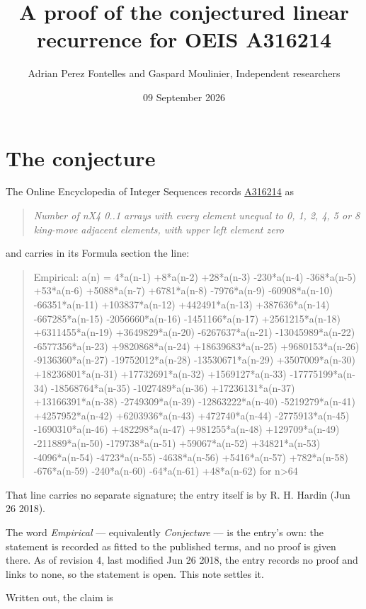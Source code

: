 \documentclass[11pt]{article}
\title{A proof of the conjectured linear recurrence for OEIS A316214}
\author{Adrian Perez Fontelles and Gaspard Moulinier, Independent researchers}
\date{09 September 2026}
\theoremstyle{definition}
\begin{document}
\maketitle
\section{The conjecture}

The Online Encyclopedia of Integer Sequences records \href{https://oeis.org/A316214}{A316214} as

\begin{quote}\itshape Number of nX4 0..1 arrays with every element unequal to 0, 1, 2, 4, 5 or 8 king-move adjacent elements, with upper left element zero\end{quote}

and carries in its Formula section the line:

\begin{quote}\ttfamily Empirical: a(n) = 4*a(n-1) +8*a(n-2) +28*a(n-3) -230*a(n-4) -368*a(n-5) +53*a(n-6) +5088*a(n-7) +6781*a(n-8) -7976*a(n-9) -60908*a(n-10) -66351*a(n-11) +103837*a(n-12) +442491*a(n-13) +387636*a(n-14) -667285*a(n-15) -2056660*a(n-16) -1451166*a(n-17) +2561215*a(n-18) +6311455*a(n-19) +3649829*a(n-20) -6267637*a(n-21) -13045989*a(n-22) -6577356*a(n-23) +9820868*a(n-24) +18639683*a(n-25) +9680153*a(n-26) -9136360*a(n-27) -19752012*a(n-28) -13530671*a(n-29) +3507009*a(n-30) +18236801*a(n-31) +17732691*a(n-32) +1569127*a(n-33) -17775199*a(n-34) -18568764*a(n-35) -1027489*a(n-36) +17236131*a(n-37) +13166391*a(n-38) -2749309*a(n-39) -12863222*a(n-40) -5219279*a(n-41) +4257952*a(n-42) +6203936*a(n-43) +472740*a(n-44) -2775913*a(n-45) -1690310*a(n-46) +482298*a(n-47) +981255*a(n-48) +129709*a(n-49) -211889*a(n-50) -179738*a(n-51) +59067*a(n-52) +34821*a(n-53) -4096*a(n-54) -4723*a(n-55) -4638*a(n-56) +5416*a(n-57) +782*a(n-58) -676*a(n-59) -240*a(n-60) -64*a(n-61) +48*a(n-62) for n>64\end{quote}

That line carries no separate signature; the entry itself is by R. H. Hardin (Jun 26 2018).

The word {\itshape Empirical} --- equivalently {\itshape Conjecture} --- is the entry's own: the statement is recorded as fitted to the published terms, and no proof is given there. As of revision 4, last modified Jun 26 2018, the entry records no proof and links to none, so the statement is open. This note settles it.

Written out, the claim is
\end{document}
